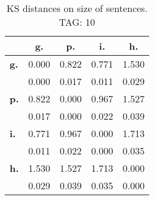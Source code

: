 \begin{table}[h!]
\begin{center}
\begin{tabular}{| l || c | c | c | c |}\hline
 & {\bf g.} & {\bf p.} & {\bf i.} & {\bf h.} \\\hline\hline
{\bf g.} & 0.000 & 0.822 & 0.771 & 1.530 \\
{\bf } & 0.000 & 0.017 & 0.011 & 0.029 \\\hline
{\bf p.} & 0.822 & 0.000 & 0.967 & 1.527 \\
{\bf } & 0.017 & 0.000 & 0.022 & 0.039 \\\hline
{\bf i.} & 0.771 & 0.967 & 0.000 & 1.713 \\
{\bf } & 0.011 & 0.022 & 0.000 & 0.035 \\\hline
{\bf h.} & 1.530 & 1.527 & 1.713 & 0.000 \\
{\bf } & 0.029 & 0.039 & 0.035 & 0.000 \\\hline
\end{tabular}
\caption{KS distances on size of sentences. TAG: 10}
\end{center}
\end{table}